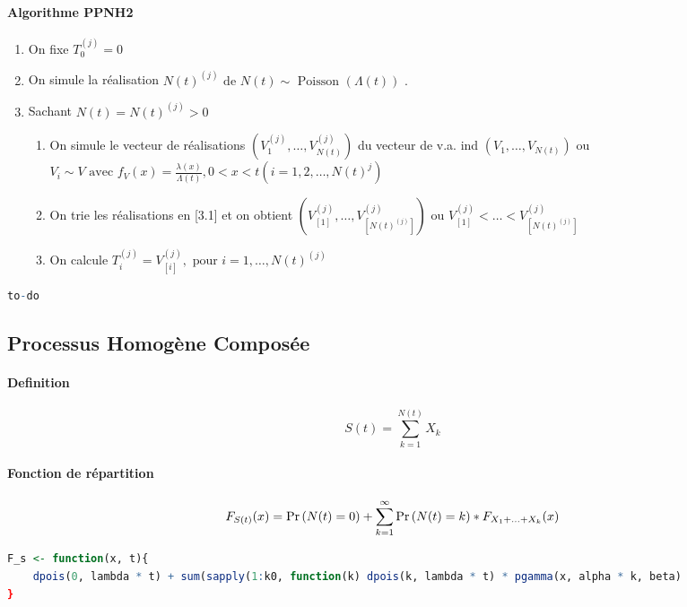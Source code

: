 \paragraph{Algorithme PPNH2}
\begin{enumerate}
    \item On fixe $T_{0}^{(j)}=0$
    \item On simule la réalisation $N(t)^{(j)} \text { de } N(t) \sim \text { Poisson }(\Lambda(t)) \text { . }$
\item Sachant $N(t)=N(t)^{(j)}>0$
    \begin{enumerate}[label=3.\arabic*]
        \item On simule le vecteur de réalisations $\left(V_{1}^{(j)}, \ldots, V_{N(t)}^{(j)}\right)$ du vecteur de v.a. ind $\left(V_{1}, \ldots, V_{N(t)}\right)$ ou  $V_{i} \sim V \text { avec } f_{V}(x)=\frac{\lambda(x)}{\Lambda(t)}, 0<x<t\left(i=1,2, \ldots, N(t)^{j}\right)$
        \item On trie les réalisations en [3.1] et on obtient $\left(V_{[1]}^{(j)}, \ldots, V_{\left[N(t)^{(j)}\right]}^{(j)}\right)$ ou $V_{[1]}^{(j)}<\ldots<V_{\left[N(t)^{(j)}\right]}^{(j)}$
        \item On calcule  $T_{i}^{(j)}=V_{[i]}^{(j)}, \text { pour } i=1, \ldots, N(t)^{(j)}$
\end{enumerate}
 \end{enumerate}


\begin{lstlisting}[language=R, caption={Mise en oeuvre de PPNH2 en R}]
to-do
\end{lstlisting}

\subsection{Processus Homogène Composée}

\paragraph{Definition}
\[ S(t) = \sum_{k=1}^{N(t)} X_k \]

\paragraph{Fonction de répartition}
\[ F_{S(t)}(x) = \Pr \left( N(t) = 0 \right) + \sum_{k=1}^\infty \Pr \left( N(t) = k \right) * F_{X_1+...+X_k}(x) \]
\begin{lstlisting}[language=R, caption={Exemple Pois-Gamma}]
F_s <- function(x, t){
    dpois(0, lambda * t) + sum(sapply(1:k0, function(k) dpois(k, lambda * t) * pgamma(x, alpha * k, beta)
}
\end{lstlisting}

